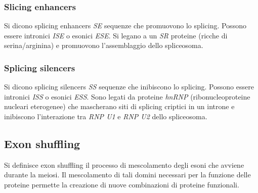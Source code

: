 \subsubsection{Slicing enhancers}
Si dicono splicing enhancers \emph{SE} sequenze che promuovono lo splicing. Possono essere intronici \emph{ISE} o esonici \emph{ESE}. Si legano a un \emph{SR} proteine (ricche di 
serina/arginina) e promuovono l'assemblaggio dello spliceosoma. \subsubsection{Splicing silencers}
Si dicono splicing silencers \emph{SS} sequenze che inibiscono lo splicing. Possono essere intronici \emph{ISS} o esonici \emph{ESS}. Sono legati da proteine \emph{hnRNP} 
(ribonucleoproteine nucleari eterogenee) che mascherano siti di splicing criptici in un introne e inibiscono l'interazione tra \emph{RNP U1} e \emph{RNP U2} dello spliceosoma. 
\subsection{Exon shuffling}
Si definisce exon shuffling il processo di mescolamento degli esoni che avviene durante la meiosi. Il mescolamento di tali domini necessari per la funzione delle proteine permette
la creazione di nuove combinazioni di proteine funzionali. 
